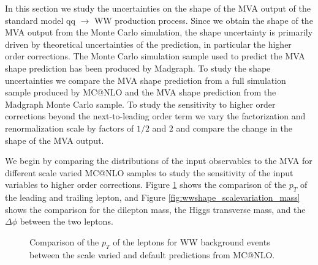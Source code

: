 In this section we study the uncertainties on the shape of the MVA output of the 
standard model qq $\rightarrow$ WW production process. Since we obtain the shape 
of the MVA output from the Monte Carlo simulation, the shape uncertainty is 
primarily driven by theoretical uncertainties of the prediction, in particular
the higher order corrections. The Monte Carlo simulation sample used to predict
the MVA shape prediction has been produced by Madgraph. To study the shape uncertainties
we compare the MVA shape prediction from a full simulation sample produced by MC@NLO
and the MVA shape prediction from the Madgraph Monte Carlo sample. To study the 
sensitivity to higher order corrections beyond the next-to-leading order term
we vary the factorization and renormalization scale by factors of $1/2$ and $2$ and
compare the change in the shape of the MVA output.

We begin by comparing the distributions of the input observables to the MVA for 
different scale varied MC@NLO samples to study the sensitivity of the input
variables to higher order corrections. Figure \ref{fig:wwshape_scalevariation_leptonPt}
shows the comparison of the $p_{T}$ of the leading and trailing lepton, and 
Figure \ref{fig:wwshape_scalevariation_mass} shows the comparison for
the dilepton mass, the Higgs transverse mass, and the $\Delta\phi$ between
the two leptons. 

\begin{figure}[!htbp]
\begin{center}
\caption{Comparison of the $p_{T}$ of the leptons for WW background events between the scale 
varied and default predictions from MC@NLO.
}
\label{fig:wwshape_scalevariation_leptonPt}
\end{center}
\end{figure}

